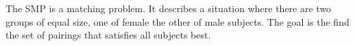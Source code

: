 The SMP is a matching problem. It describes a situation where there are two groups of equal size, one of female the other of male subjects. The goal is the find the set of pairings that satisfies all subjects best. \cite{Gusfield:1989}
